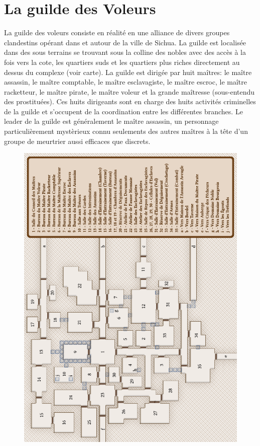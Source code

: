 \section{La guilde des Voleurs}

La guilde des voleurs consiste en réalité en une alliance de divers groupes 
clandestins opérant dans et autour de la ville de Sichua. La guilde est 
localisée dans des sous terrains se trouvant sous la colline des nobles
avec des accès à la fois vers la cote, les quartiers suds et les quartiers 
plus riches directement au dessus du complexe (voir carte). La guilde est
dirigée par huit maîtres: le maître assassin, le maître comptable, le maître 
esclavagiste, le maître escroc, le maître racketteur, le maître pirate, le 
maître voleur et la grande maîtresse (sous-entendu des prostituées). Ces huits 
dirigeants sont en charge des huits activités criminelles de la guilde et
s'occupent de la coordination entre les différentes branches. Le leader
de la guilde est généralement le maître assassin, un personnage 
particulièrement mystèrieux connu seulements des autres maîtres à la
tête d'un groupe de meurtrier aussi efficaces que discrets.


\begin{figure}[p]
\includegraphics[width=17cm]{Maps/GuildeVoleurs.png}
\end{figure}

